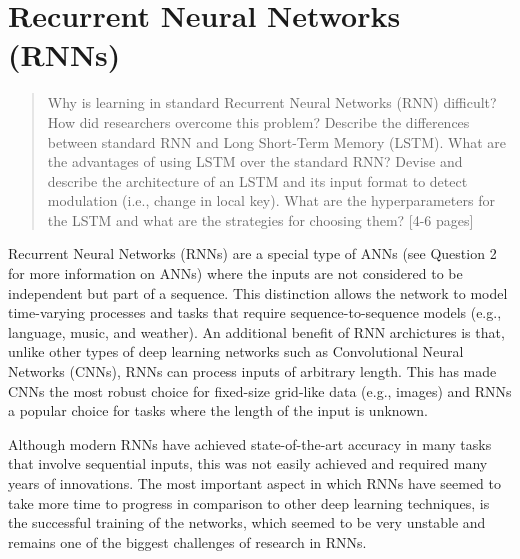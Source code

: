 \chapter{Recurrent Neural Networks (RNNs)}
\label{chap:chap90}

\begin{quote}
    Why is learning in standard Recurrent Neural Networks (RNN) difficult? How did researchers overcome this problem? Describe the differences between standard RNN and Long Short-Term Memory (LSTM). What are the advantages of using LSTM over the standard RNN? Devise and describe the architecture of an LSTM and its input format to detect modulation (i.e., change in local key). What are the hyperparameters for the LSTM and what are the strategies for choosing them? [4-6 pages]
\end{quote}
\clearpage






Recurrent Neural Networks (RNNs) are a special type of ANNs (see Question 2 for more information on ANNs) where the inputs are not considered to be independent but part of a sequence. This distinction allows the network to model time-varying processes and tasks that require sequence-to-sequence models (e.g., language, music, and weather). An additional benefit of RNN archictures is that, unlike other types of deep learning networks such as Convolutional Neural Networks (CNNs), RNNs can process inputs of arbitrary length. This has made CNNs the most robust choice for fixed-size grid-like data (e.g., images) and RNNs a popular choice for tasks where the length of the input is unknown. 

Although modern RNNs have achieved state-of-the-art accuracy in many tasks that involve sequential inputs, this was not easily achieved and required many years of innovations. The most important aspect in which RNNs have seemed to take more time to progress in comparison to other deep learning techniques, is the successful training of the networks, which seemed to be very unstable and remains one of the biggest challenges of research in RNNs.

